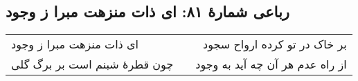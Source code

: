 \begin{center}
\section*{رباعی شمارهٔ ۸۱: ای ذات منزهت مبرا ز وجود}
\label{sec:081}
\begin{longtable}{l p{0.5cm} r}
ای ذات منزهت مبرا ز وجود
&&
بر خاک در تو کرده ارواح سجود
\\
چون قطرهٔ شبنم است بر برگ گلی
&&
از راه عدم هر آن چه آید به وجود
\\
\end{longtable}
\end{center}
